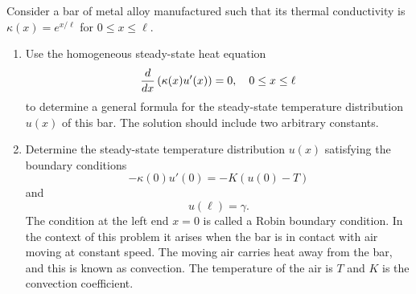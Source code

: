 
Consider a bar of metal alloy manufactured such that its thermal conductivity is $\kappa(x) = e^{x/\ell}$ for  $0\le x\le \ell$.
\\
\begin{enumerate}
\item  Use the homogeneous steady-state heat equation
\[
{d \over d x} \left(\kappa(x) u'(x)\right)=0,\quad 0\le x\le \ell
\]
to determine a general formula for the steady-state temperature distribution $u(x)$ of this bar. The solution should include two arbitrary constants. 
\\
\item Determine the steady-state temperature distribution $u(x)$ satisfying the boundary conditions
\[
-\kappa\left(0\right)u'\left(0\right) = -K\left(u\left(0\right)-T\right)
\]
and
\[
u(\ell) = \gamma.
\]
The condition at the left end $x=0$ is called a Robin boundary condition. In the context of this problem it arises when the bar is in contact with air moving at constant speed.  The moving air carries heat away from the bar, and this is known as convection. The temperature of the air is $T$ and $K$ is the convection coefficient.
\end{enumerate}



